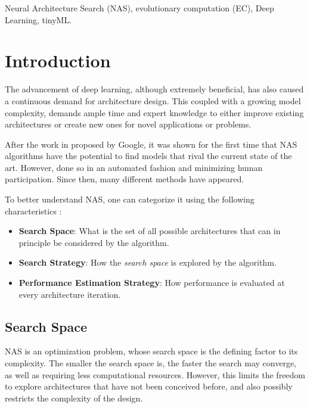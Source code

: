 \documentclass[10pt,        %
               a4paper,     %
               journal,     %
               ]{IEEEtran}
\begin{document}
\begin{IEEEkeywords}
Neural Architecture Search (NAS), evolutionary computation (EC), Deep Learning, tinyML.
\end{IEEEkeywords}

\section{Introduction}
The advancement of deep learning, although extremely beneficial, has also caused a continuous demand for
architecture design. This coupled with a growing model complexity, demands ample time and expert knowledge to
either improve existing architectures or create new ones for novel applications or problems.


After the work in \cite{zoph2016neural} proposed by Google, it was shown for the first time that NAS algorithms
have the potential to find models that rival the current state of the art. However, done so in an automated fashion and minimizing
human participation. Since then, many different methods have appeared.

To better understand NAS, one can categorize it using the following characteristics \cite{elsken2019neural}:
\begin{itemize}
    \item \textbf{Search Space}: What is the set of all possible architectures that can in principle be considered
    by the algorithm.

    \item \textbf{Search Strategy}: How the \textit{search space} is explored by the algorithm.

    \item \textbf{Performance Estimation Strategy}: How performance is evaluated at every architecture iteration.
\end{itemize}

\subsection{Search Space}
\label{search}
NAS is an optimization problem, whose search space is the defining factor to its complexity.
The smaller the search space is, the faster the search may converge,
as well as requiring less computational resources. However, this limits the freedom to
explore architectures that have not been conceived before, and also possibly restricts the complexity of the design.
\end{document}
